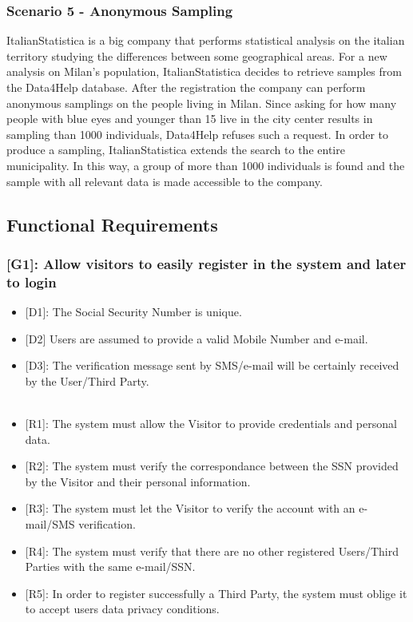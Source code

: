 \documentclass[12pt,a4paper]{article}
\begin{document}
	\subsubsection*{Scenario 5 - Anonymous Sampling}
		ItalianStatistica is a big company that performs statistical analysis on the italian territory studying the differences between some geographical areas. For a new analysis on Milan's population, ItalianStatistica decides to retrieve samples from the Data4Help database. After the registration the company can perform anonymous samplings on the people living in Milan. Since asking for how many people with blue eyes and younger than 15 live in the city center results in sampling than 1000 individuals, Data4Help refuses such a request. In order to produce a sampling, ItalianStatistica extends the search to the entire municipality. In this way, a group of more than 1000 individuals is found and the sample with all relevant data is made accessible to the company.

	\newpage

	\subsection{Functional Requirements}

	\subsubsection*{{[}{G1}{]}: Allow visitors to easily register in the system and later to login}
	\begin{itemize}
		\begin{itemize}
			\item {[D1]}: The Social Security Number is unique.
			\item {[D2]} Users are assumed to provide a valid Mobile Number and e-mail.
			\item {[D3]}: The verification message sent by SMS/e-mail will be certainly received by the User/Third Party.
			\\\\
			\item {[R1]}: The system must allow the Visitor to provide credentials and personal data.
			\item {[R2]}: The system must verify the correspondance between the SSN provided by the Visitor and their personal information.
			\item {[R3]}: The system must let the Visitor to verify the account with an e-mail/SMS verification.
			\item {[R4]}: The system must verify that there are no other registered Users/Third Parties with the same e-mail/SSN.
			\item {[R5]}: In order to register successfully a Third Party, the system must oblige it to accept users data privacy conditions.
		\end{itemize}
	\end{itemize}
\end{document}
